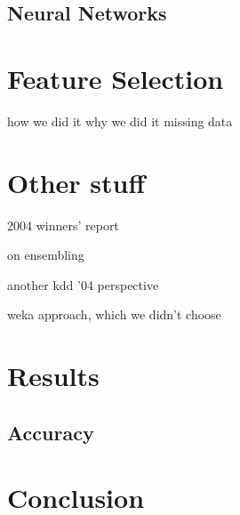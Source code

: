 \documentclass{article}
\begin{document}
\subsection{Neural Networks}



\section{Feature Selection}
how we did it
why we did it
  missing data


\section{Other stuff}
2004 winners' report \cite{vogel2004anti}

on ensembling \cite{caruana2004ensemble}

another kdd '04 perspective \cite{caruana2004kdd}

weka approach, which we didn't choose \cite{pfahringer2004weka}


\section{Results}
\subsection{Accuracy}


\section{Conclusion}




\end{document}
